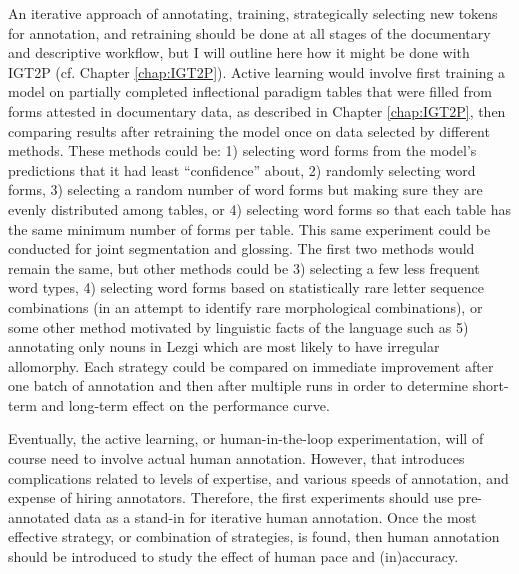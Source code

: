 An iterative approach of annotating, training, strategically selecting new tokens for annotation, and retraining should be done at all stages of the documentary and descriptive workflow, but I will outline here how it might be done with IGT2P (cf. Chapter \ref{chap:IGT2P}).
Active learning would involve first training a model on partially completed inflectional paradigm tables that were filled from forms attested in documentary data, as described in Chapter \ref{chap:IGT2P}, then comparing results after retraining the model once on data selected by different methods. These methods could be: 1) selecting word forms from the model’s predictions that it had least ``confidence'' about, 2) randomly selecting word forms, 3) selecting a random number of word forms but making sure they are evenly distributed among tables, or 4) selecting word forms so that each table has the same minimum number of forms per table. This same experiment could be conducted for joint segmentation and glossing. The first two methods would remain the same, but other methods could be 3) selecting a few less frequent word types, 4) selecting word forms based on statistically rare letter sequence combinations (in an attempt to identify rare morphological combinations), or some other method motivated by linguistic facts of the language such as 5) annotating only nouns in Lezgi which are most likely to have irregular allomorphy. Each strategy could be compared on immediate improvement after one batch of annotation and then after multiple runs in order to determine short-term and long-term effect on the performance curve. 


Eventually, the active learning, or human-in-the-loop experimentation, will of course need to involve actual human annotation. However, that introduces complications related to levels of expertise, and various speeds of annotation, and expense of hiring annotators. Therefore, the first experiments should use pre-annotated data as a stand-in for iterative human annotation. Once the most effective strategy, or combination of strategies, is found, then human annotation should be introduced to study the effect of human pace and (in)accuracy. 

